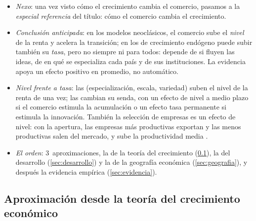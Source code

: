 \documentclass[11pt]{article}
\begin{document}
\begin{itemize}
\item \emph{Nexo}: una vez visto cómo el crecimiento cambia el comercio, pasamos a la \emph{especial referencia} del título: cómo el comercio cambia el crecimiento.
\item \emph{Conclusión anticipada}: en los modelos neoclásicos, el comercio sube el \emph{nivel} de la renta y acelera la transición; en los de crecimiento endógeno puede subir también su \emph{tasa}, pero no siempre ni para todos: depende de si fluyen las ideas, de en qué se especializa cada país y de sus instituciones. La evidencia apoya un efecto positivo en promedio, no automático.
\item \emph{Nivel frente a tasa}: las  (especialización, escala, variedad) suben el nivel de la renta de una vez; las  cambian su senda, con un efecto de nivel a medio plazo si el comercio estimula la acumulación o un efecto tasa permanente si estimula la innovación. También la selección de empresas es un efecto de nivel: con la apertura, las empresas más productivas exportan y las menos productivas salen del mercado, y sube la productividad media\nocite{Melitz2003Impact} .
\item \emph{El orden}: 3~aproximaciones, la de la teoría del crecimiento (\ref{sec:teoria-crecimiento}), la del desarrollo (\ref{sec:desarrollo}) y la de la geografía económica (\ref{sec:geografia}), y después la evidencia empírica (\ref{sec:evidencia}).
\end{itemize}

\subsection{Aproximación desde la teoría del crecimiento económico}\label{sec:teoria-crecimiento}
\end{document}
